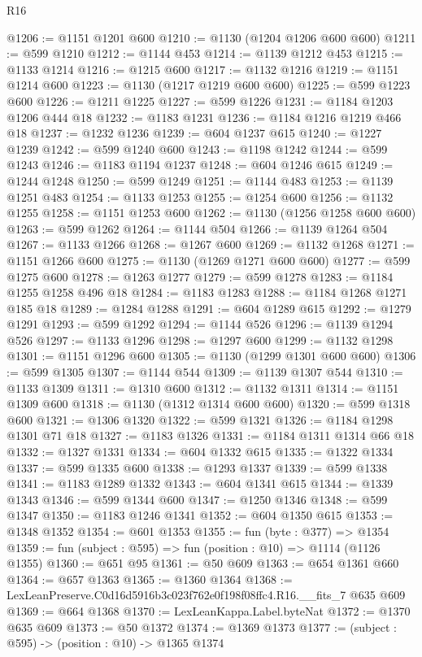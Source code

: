 \begin{lexlean}{R16}
\begin{coremodule}
@1206 := @1151 @1201 @600
@1210 := @1130 (@1204 @1206 @600 @600)
@1211 := @599 @1210
@1212 := @1144 @453
@1214 := @1139 @1212 @453
@1215 := @1133 @1214
@1216 := @1215 @600
@1217 := @1132 @1216
@1219 := @1151 @1214 @600
@1223 := @1130 (@1217 @1219 @600 @600)
@1225 := @599 @1223 @600
@1226 := @1211 @1225
@1227 := @599 @1226
@1231 := @1184 @1203 @1206 @444 @18
@1232 := @1183 @1231
@1236 := @1184 @1216 @1219 @466 @18
@1237 := @1232 @1236
@1239 := @604 @1237 @615
@1240 := @1227 @1239
@1242 := @599 @1240 @600
@1243 := @1198 @1242
@1244 := @599 @1243
@1246 := @1183 @1194 @1237
@1248 := @604 @1246 @615
@1249 := @1244 @1248
@1250 := @599 @1249
@1251 := @1144 @483
@1253 := @1139 @1251 @483
@1254 := @1133 @1253
@1255 := @1254 @600
@1256 := @1132 @1255
@1258 := @1151 @1253 @600
@1262 := @1130 (@1256 @1258 @600 @600)
@1263 := @599 @1262
@1264 := @1144 @504
@1266 := @1139 @1264 @504
@1267 := @1133 @1266
@1268 := @1267 @600
@1269 := @1132 @1268
@1271 := @1151 @1266 @600
@1275 := @1130 (@1269 @1271 @600 @600)
@1277 := @599 @1275 @600
@1278 := @1263 @1277
@1279 := @599 @1278
@1283 := @1184 @1255 @1258 @496 @18
@1284 := @1183 @1283
@1288 := @1184 @1268 @1271 @185 @18
@1289 := @1284 @1288
@1291 := @604 @1289 @615
@1292 := @1279 @1291
@1293 := @599 @1292
@1294 := @1144 @526
@1296 := @1139 @1294 @526
@1297 := @1133 @1296
@1298 := @1297 @600
@1299 := @1132 @1298
@1301 := @1151 @1296 @600
@1305 := @1130 (@1299 @1301 @600 @600)
@1306 := @599 @1305
@1307 := @1144 @544
@1309 := @1139 @1307 @544
@1310 := @1133 @1309
@1311 := @1310 @600
@1312 := @1132 @1311
@1314 := @1151 @1309 @600
@1318 := @1130 (@1312 @1314 @600 @600)
@1320 := @599 @1318 @600
@1321 := @1306 @1320
@1322 := @599 @1321
@1326 := @1184 @1298 @1301 @71 @18
@1327 := @1183 @1326
@1331 := @1184 @1311 @1314 @66 @18
@1332 := @1327 @1331
@1334 := @604 @1332 @615
@1335 := @1322 @1334
@1337 := @599 @1335 @600
@1338 := @1293 @1337
@1339 := @599 @1338
@1341 := @1183 @1289 @1332
@1343 := @604 @1341 @615
@1344 := @1339 @1343
@1346 := @599 @1344 @600
@1347 := @1250 @1346
@1348 := @599 @1347
@1350 := @1183 @1246 @1341
@1352 := @604 @1350 @615
@1353 := @1348 @1352
@1354 := @601 @1353
@1355 := fun (byte : @377) => @1354
@1359 := fun (subject : @595) => fun (position : @10) => @1114 (@1126 @1355)
@1360 := @651 @95
@1361 := @50 @609
@1363 := @654 @1361 @660
@1364 := @657 @1363
@1365 := @1360 @1364
@1368 := LexLeanPreserve.C0d16d5916b3c023f762e0f198f08ffc4.R16.__fits_7 @635 @609
@1369 := @664 @1368
@1370 := LexLeanKappa.Label.byteNat
@1372 := @1370 @635 @609
@1373 := @50 @1372
@1374 := @1369 @1373
@1377 := (subject : @595) -> (position : @10) -> @1365 @1374

\end{coremodule}
\end{lexlean}
